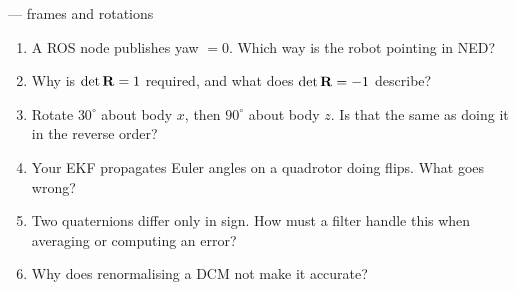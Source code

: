 \begin{frame}{\checkq{} --- frames and rotations}
  \begin{enumerate}
    \item A ROS node publishes yaw $=0$. Which way is the robot pointing in NED?
    \item Why is $\det\mathbf{R}=1$ required, and what does $\det\mathbf{R}=-1$ describe?
    \item Rotate $30^\circ$ about body $x$, then $90^\circ$ about body $z$. Is that the same as doing it in the reverse order?
    \item Your EKF propagates Euler angles on a quadrotor doing flips. What goes wrong?
    \item Two quaternions differ only in sign. How must a filter handle this when averaging or computing an error?
    \item Why does renormalising a DCM not make it accurate?
  \end{enumerate}
\end{frame}
